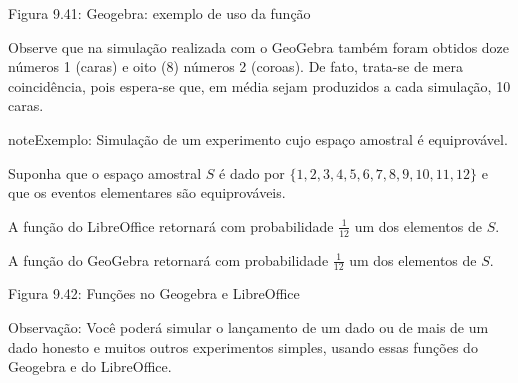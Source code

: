 Figura 9.41: Geogebra: exemplo de uso da função 

Observe que na simulação realizada com o GeoGebra também foram obtidos doze números 1 (caras) e oito (8) números 2 (coroas). De fato, trata-se de mera coincidência, pois espera-se que, em média sejam produzidos a cada simulação, 10 caras.

\begin{sphinxadmonition}{note}{Exemplo: Simulação de um experimento cujo espaço amostral é equiprovável.}

Suponha que o espaço amostral \(S\) é dado por \(\{ 1,2,3,4,5,6,7,8,9,10,11,12\}\) e que os eventos elementares são equiprováveis.

A função do LibreOffice  retornará com probabilidade \(\frac{1}{12}\) um dos elementos de \(S\).

A função do GeoGebra  retornará com probabilidade \(\frac{1}{12}\) um dos elementos de \(S\).
\label{\detokenize{PE511-A:id4}}
\begin{figure}[H]
\centering

\noindent{}
\label{\detokenize{PE511-A:id4}}\end{figure}

Figura 9.42: Funções no Geogebra e LibreOffice

Observação:  Você poderá simular o lançamento de um dado ou de mais de um dado honesto e muitos outros experimentos simples, usando essas funções do Geogebra e do LibreOffice.
\end{sphinxadmonition}
